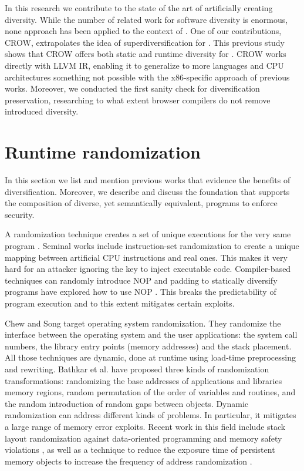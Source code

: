 In this research we contribute to the state of the art of artificially creating diversity. While the number of related work for software diversity is enormous, none approach has been applied to the context of \wasm. One of our contributions, CROW, extrapolates the idea of superdiversification for \wasm. This previous study shows that CROW offers both static and runtime diversity for \wasm. CROW works directly with LLVM IR, enabling it to generalize to more languages and CPU architectures something not possible with the x86-specific approach of previous works.
Moreover, we conducted the first sanity check for diversification preservation, researching to what extent browser compilers do not remove introduced diversity.

\section{Runtime randomization}
\label{sota:randomization}

In this section we list and mention previous works that evidence the benefits of diversification. Moreover, we describe and discuss the foundation that supports the composition of diverse, yet semantically equivalent, programs to enforce security.


A randomization technique creates a set of unique executions for the very same program \cite{bhatkar03}. Seminal works include instruction-set randomization \cite{Kc03,barrantes2003randomized}
to create a unique mapping between artificial CPU instructions and real ones. This makes  it very hard for an attacker ignoring the key to inject executable code. Compiler-based  techniques can randomly introduce NOP and padding to statically diversify programs \cite{jackson} have explored how to use NOP .  This breaks the predictability of program execution and to this extent mitigates certain exploits.


Chew and Song \cite{Chew02mitigatingbuffer} target operating system randomization. They randomize the interface between the operating system and the user applications:
the system call numbers, the library entry points (memory addresses) and the stack placement. All those techniques are dynamic, done at runtime using load-time preprocessing and rewriting. 
Bathkar et al. \cite{bhatkar03,bhatkar2005efficient} have proposed  three kinds of randomization transformations: randomizing the base addresses of applications and libraries  memory regions, random permutation of the order of variables and routines, and the random introduction of random gaps between objects. 
Dynamic randomization can address different kinds of problems. In particular, it  mitigates a large range of memory error exploits. 
Recent work in this field include stack layout randomization against data-oriented programming \cite{aga2019smokestack} and memory safety violations \cite{lee2021savior}, as well as a technique to reduce the exposure time of persistent memory objects to increase the frequency of address randomization \cite{xu2020merr}.

